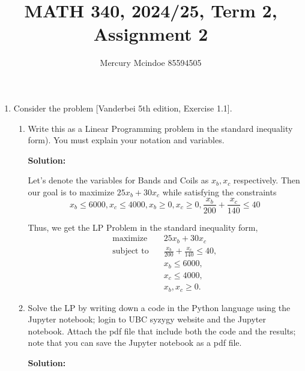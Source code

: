 \documentclass[11pt]{article}
\title{MATH 340, 2024/25, Term 2, Assignment 2}
\author{Mercury Mcindoe 85594505}
\newenvironment{solution}
  {\par\noindent\textbf{Solution:}\par}
  {\par}
\begin{document}
\maketitle 
\thispagestyle{empty}

\begin{enumerate}
  \item Consider the problem [Vanderbei 5th edition, Exercise 1.1].
    \begin{enumerate}[label=(\alph*)]
      \item Write this as a Linear Programming problem in the standard inequality form).
You must explain your notation and variables. 
      \begin{solution}
        Let's denote the variables for Bands and Coils as $x_b,x_c$ respectively. Then our goal is to 
        maximize $25x_b + 30x_c$ while satisfying the constraints  
        $$x_b \le 6000, x_c \le 4000, x_b \ge 0, x_c \ge 0, \frac{x_b}{200}+\frac{x_c}{140} \le 40$$

        Thus, we get the LP Problem in the standard inequality form,
        \[
        \begin{aligned}
          \text{maximize} \quad & 25x_b + 30x_c \\
          \text{subject to} \quad 
          & \frac{x_b}{200} + \frac{x_c}{140} \leq 40, \\
          & x_b \leq 6000, \\
          & x_c \leq 4000, \\
          & x_b, x_c \geq 0.
        \end{aligned}
\] 
      \end{solution}
     \item Solve the LP by writing down a code in the Python language using the Jupyter notebook; login to UBC syzygy website and the Jupyter notebook. Attach the pdf file that include both the code and the results; note that you can
save the Jupyter notebook as a pdf file. 
       \begin{solution}
      
       \end{solution}


\end{enumerate}
\end{enumerate}
\end{document}
